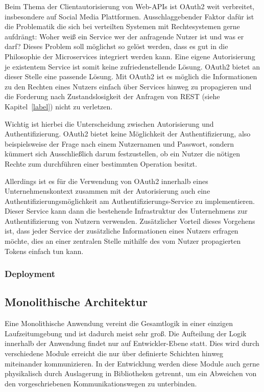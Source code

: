 \documentclass[12pt,a4paper,bibliography=totocnumbered,listof=totocnumbered]{scrartcl}
\begin{document}
Beim Thema der Clientautorisierung von Web-\acp{API} ist OAuth2 weit verbreitet, insbesondere auf Social Media Plattformen. Ausschlaggebender Faktor dafür ist die Problematik die sich bei verteilten Systemen mit Rechtesystemen gerne aufdrängt: Woher weiß ein Service wer der anfragende Nutzer ist und was er darf? Dieses Problem soll möglichst so gelöst werden, dass es gut in die Philosophie der Microservices integriert werden kann. Eine eigene Autorisierung je existentem Service ist somit keine zufriedenstellende Lösung. OAuth2 bietet an dieser Stelle eine passende Lösung. Mit OAuth2 ist es möglich die Informationen zu den Rechten eines Nutzers einfach über Services hinweg zu propagieren und die Forderung nach Zustandslosigkeit der Anfragen von REST (siehe Kapitel~\ref{label}) nicht zu verletzen.

Wichtig ist hierbei die Unterscheidung zwischen Autorisierung und Authentifizierung. OAuth2 bietet keine Möglichkeit der Authentifizierung, also beispielsweise der Frage nach einem Nutzernamen und Passwort, sondern kümmert sich Ausschließlich darum festzustellen, ob ein Nutzer die nötigen Rechte zum durchführen einer bestimmten Operation besitzt.\cite{degges}

Allerdings ist es für die Verwendung von OAuth2 innerhalb eines Unternehmenskontext zusammen mit der Autorisierung auch eine Authentifizierungsmöglichkeit am Authentifizierungs-Service zu implementieren. Dieser Service kann dann die bestehende Infrastruktur des Unternehmens zur Authentifizierung von Nutzern verwenden. Zusätzlicher Vorteil dieses Vorgehens ist, dass jeder Service der zusätzliche Informationen eines Nutzers erfragen möchte, dies an einer zentralen Stelle mithilfe des vom Nutzer propagierten Tokens einfach tun kann.

\subsubsection{Deployment}


\subsection{Monolithische Architektur}\label{ch:mon-arch}

Eine Monolithische Anwendung vereint die Gesamtlogik in einer einzigen Laufzeitumgebung und ist dadurch meist sehr groß. Die Aufteilung der Logik innerhalb der Anwendung findet nur auf Entwickler-Ebene statt. Dies wird durch verschiedene Module erreicht die nur über definierte Schichten hinweg miteinander kommunizieren. In der Entwicklung werden diese Module auch gerne physikalisch durch Auslagerung in Bibliotheken getrennt, um ein Abweichen von den vorgeschriebenen Kommunikationswegen zu unterbinden.
\end{document}
